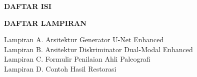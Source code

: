 \documentclass[12pt,a4paper]{article}
\begin{document}
\newpage
{}


\newpage
{}



\newpage{}%



\newpage
\vspace{2cm}
\begin{center}
      {\fontsize{14}{16.8}\selectfont\textbf{DAFTAR ISI}}\\[1em]
\end{center}
\vspace{1em}

{\singlespacing\setlength{\parskip}{0pt}
      \makeatletter
      \makeatother
}

\newpage
{}
\vspace{2cm}
\begin{center}
      {\fontsize{14}{16.8}\selectfont\textbf{DAFTAR LAMPIRAN}}\\[1em]
\end{center}
\vspace{1em}

{\singlespacing\setlength{\parskip}{0pt}
      Lampiran A. Arsitektur Generator U-Net Enhanced \dotfill \pageref{lampiran:A}\\
      Lampiran B. Arsitektur Diskriminator Dual-Modal Enhanced \dotfill \pageref{lampiran:B}\\
      Lampiran C. Formulir Penilaian Ahli Paleografi \dotfill \pageref{lampiran:C}\\
      Lampiran D. Contoh Hasil Restorasi \dotfill \pageref{lampiran:D}\\
}
\end{document}
